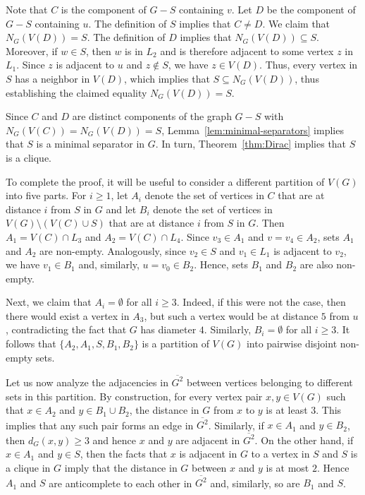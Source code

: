 \documentclass[12pt]{article}
\newcommand{\sq}[1]{\overline{#1^2}}
\begin{document}
Note that $C$ is the component of $G-S$ containing $v$.  
Let $D$ be the component of $G-S$ containing $u$.  
The definition of $S$ implies that $C\neq D$. 
We claim that $N_G(V(D)) = S$.  
The definition of $D$ implies that $N_G(V(D)) \subseteq S$.  
Moreover, if $w\in S$, then $w$ is in $L_2$ and is therefore adjacent to some vertex $z$ in $L_1$.
Since $z$ is adjacent to $u$ and $z\not\in S$, we have $z\in V(D)$.
Thus, every vertex in $S$ has a neighbor in $V(D)$, which implies that $S\subseteq N_G(V(D))$, thus establishing the claimed equality $N_G(V(D)) = S$.

Since $C$ and $D$ are distinct components of the graph $G-S$ with $N_G(V(C)) = N_G(V(D)) = S$, Lemma~\ref{lem:minimal-separators} implies that $S$ is a minimal separator in $G$.  In turn, Theorem~\ref{thm:Dirac} implies that $S$ is a clique.

To complete the proof, it will be useful to consider a different partition of $V(G)$ into five parts.  
For $i\ge 1$, let $A_i$ denote the set of vertices in $C$ that are at distance $i$ from $S$ in $G$ and let $B_i$ denote the set of vertices in $V(G)\setminus (V(C)\cup S)$ that are at distance $i$ from $S$ in $G$.
Then $A_1 = V(C)\cap L_3$ and $A_2 = V(C)\cap L_4$.  
Since $v_3\in A_1$ and $v= v_4\in A_2$, sets $A_1$ and $A_2$ are non-empty.
Analogously, since $v_2\in S$ and $v_1\in L_1$ is adjacent to $v_2$, we have $v_1\in B_1$ and, similarly, $u = v_0\in B_2$. 
Hence, sets $B_1$ and $B_2$ are also non-empty.

Next, we claim that $A_i = \emptyset$ for all $i\ge 3$.  Indeed, if this were not the case, then there would exist a vertex in $A_3$, but such a vertex would be at distance $5$ from $u$, contradicting the fact that $G$ has diameter $4$.  
Similarly, $B_i = \emptyset$ for all $i\ge 3$.  
It follows that $\{A_2, A_1, S, B_1, B_2\}$ is a partition of $V(G)$ into pairwise disjoint non-empty sets.

Let us now analyze the adjacencies in $\sq{G}$ between
vertices belonging to different sets in this partition.  
By construction, for every vertex pair $x,y\in V(G)$ such that $x\in A_2$ and $y\in B_1\cup B_2$, the distance in $G$ from $x$ to $y$ is at least $3$.
This implies that any such pair forms an edge in $\sq{G}$.  
Similarly, if $x\in A_1$ and $y\in B_2$, then $d_G(x,y) \ge 3$ and hence $x$ and $y$ are adjacent in $\sq{G}$.  
On the other hand, if $x\in A_1$ and $y\in S$, then the facts that $x$ is adjacent in $G$ to a vertex in $S$ and $S$ is a
clique in $G$ imply that the distance in $G$ between $x$ and $y$ is at most $2$.  
Hence $A_1$ and $S$ are anticomplete to each other in $\sq{G}$ and, similarly, so are $B_1$ and $S$.
\end{document}
